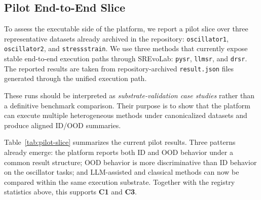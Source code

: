 \subsection{Pilot End-to-End Slice}

To assess the executable side of the platform, we report a pilot slice over three representative datasets already archived in the repository: \texttt{oscillator1}, \texttt{oscillator2}, and \texttt{stressstrain}. We use three methods that currently expose stable end-to-end execution paths through SREvoLab: \texttt{pysr}, \texttt{llmsr}, and \texttt{drsr}. The reported results are taken from repository-archived \texttt{result.json} files generated through the unified execution path.

These runs should be interpreted as \emph{substrate-validation case studies} rather than a definitive benchmark comparison. Their purpose is to show that the platform can execute multiple heterogeneous methods under canonicalized datasets and produce aligned ID/OOD summaries.

Table~\ref{tab:pilot-slice} summarizes the current pilot results. Three patterns already emerge: the platform reports both ID and OOD behavior under a common result structure; OOD behavior is more discriminative than ID behavior on the oscillator tasks; and LLM-assisted and classical methods can now be compared within the same execution substrate. Together with the registry statistics above, this supports \textbf{C1} and \textbf{C3}.

